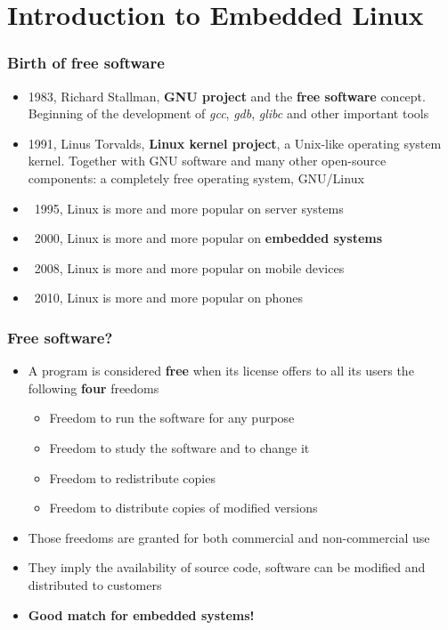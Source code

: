 \section{Introduction to Embedded Linux}

\begin{frame}
  \frametitle{Birth of free software}
  \begin{itemize}
  \item 1983, Richard Stallman, {\bf GNU project} and the {\bf free
      software} concept.  Beginning of the development of {\em gcc},
    {\em gdb}, {\em glibc} and other important tools
  \item 1991, Linus Torvalds, {\bf Linux kernel project}, a Unix-like
    operating system kernel. Together with GNU software and many other
    open-source components: a completely free operating system,
    GNU/Linux
  \item ~1995, Linux is more and more popular on server systems
  \item ~2000, Linux is more and more popular on {\bf embedded
      systems}
  \item ~2008, Linux is more and more popular on mobile devices
  \item ~2010, Linux is more and more popular on phones
  \end{itemize}
\end{frame}

\begin{frame}
  \frametitle{Free software?}
  \begin{itemize}
  \item A program is considered {\bf free} when its license offers to
    all its users the following {\bf four} freedoms
    \begin{itemize}
    \item Freedom to run the software for any purpose
    \item Freedom to study the software and to change it
    \item Freedom to redistribute copies
    \item Freedom to distribute copies of modified versions
    \end{itemize}
  \item Those freedoms are granted for both commercial and
    non-commercial use
  \item They imply the availability of source code, software can be
    modified and distributed to customers
  \item {\bf Good match for embedded systems!}
  \end{itemize}
\end{frame}

